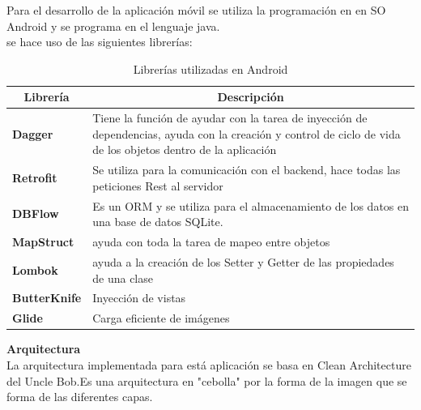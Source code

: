 Para el desarrollo de la aplicación móvil se utiliza la programación en en SO Android y se programa en el lenguaje java. \\

se hace uso de las siguientes librerías:

\begin{table}[h!]
\centering
\begin{tabular}{|l|p{13cm}|}
\hline
\multicolumn{1}{|c|}{\textbf{Librería}} & \multicolumn{1}{c|}{\textbf{Descripción}} \\ \hline
\textbf{Dagger} & Tiene la función de ayudar con la tarea de inyección de dependencias, ayuda con la creación y control de ciclo de vida de los objetos dentro de la aplicación \\ \hline
\textbf{Retrofit} & Se utiliza para la comunicación con el backend, hace todas las peticiones Rest al servidor \\ \hline
\textbf{DBFlow} &  Es un ORM y se utiliza para el almacenamiento de los datos en una base de datos SQLite. \\ \hline
\textbf{MapStruct} &  ayuda con toda la tarea de mapeo entre objetos \\ \hline
\textbf{Lombok}  & ayuda a la creación de los Setter y Getter de las propiedades de una clase\\ \hline
\textbf{ButterKnife}  & Inyección de vistas\\ \hline
\textbf{Glide}  & Carga eficiente de imágenes\\ \hline
\end{tabular}%
\caption{Librerías utilizadas en Android}
\end{table}


\textbf{ Arquitectura}\\
La arquitectura implementada para está aplicación se basa en Clean Architecture del Uncle Bob.Es una arquitectura en "cebolla" por la forma de la imagen que se forma de las diferentes capas.

